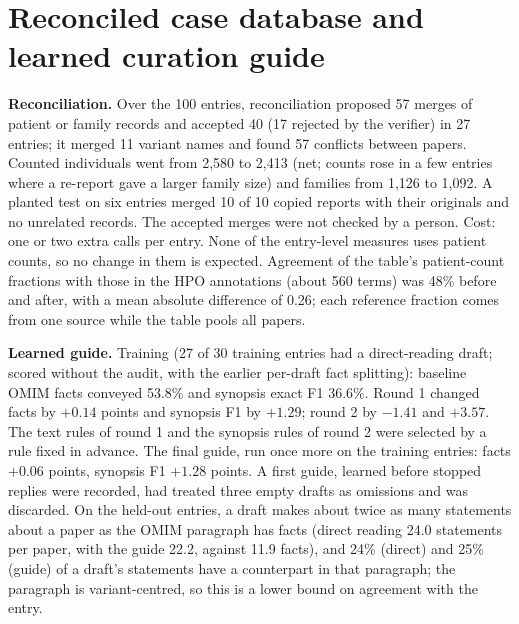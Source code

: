 \documentclass{article} %
\begin{document}
\section{Reconciled case database and learned curation guide}
\label{app:addons}
\textbf{Reconciliation.} Over the 100 entries, reconciliation proposed 57 merges of patient or family records and accepted 40 (17 rejected by the verifier) in 27 entries; it merged 11 variant names and found 57 conflicts between papers. Counted individuals went from 2,580 to 2,413 (net; counts rose in a few entries where a re-report gave a larger family size) and families from 1,126 to 1,092. A planted test on six entries merged 10 of 10 copied reports with their originals and no unrelated records. The accepted merges were not checked by a person. Cost: one or two extra calls per entry. None of the entry-level measures uses patient counts, so no change in them is expected. Agreement of the table's patient-count fractions with those in the HPO annotations (about 560 terms) was 48\% before and after, with a mean absolute difference of 0.26; each reference fraction comes from one source while the table pools all papers.

\textbf{Learned guide.} Training (27 of 30 training entries had a direct-reading draft; scored without the audit, with the earlier per-draft fact splitting): baseline OMIM facts conveyed 53.8\% and synopsis exact F1 36.6\%. Round 1 changed facts by $+0.14$ points and synopsis F1 by $+1.29$; round 2 by $-1.41$ and $+3.57$. The text rules of round 1 and the synopsis rules of round 2 were selected by a rule fixed in advance. The final guide, run once more on the training entries: facts $+0.06$ points, synopsis F1 $+1.28$ points. A first guide, learned before stopped replies were recorded, had treated three empty drafts as omissions and was discarded. On the held-out entries, a draft makes about twice as many statements about a paper as the OMIM paragraph has facts (direct reading 24.0 statements per paper, with the guide 22.2, against 11.9 facts), and 24\% (direct) and 25\% (guide) of a draft's statements have a counterpart in that paragraph; the paragraph is variant-centred, so this is a lower bound on agreement with the entry.
\end{document}
